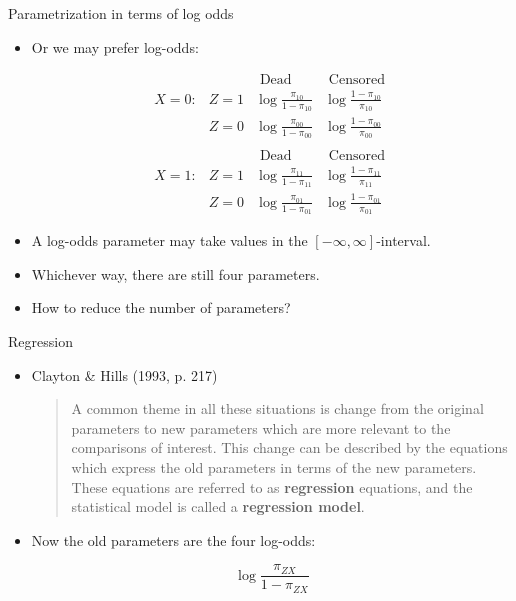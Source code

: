 \documentclass[10pt]{beamer}\usepackage[]{graphicx}\usepackage[]{color}
\begin{document}
\begin{frame}{Parametrization in terms of log odds}
	\begin{itemize}
		\item Or we may prefer log-odds:
		
		$$
		\begin{array}{llcc} 
		&      & \text { Dead } & \text { Censored } \\
		X=0: & Z=1 & \log\frac{\pi_{10}}{1-\pi_{10}} & \log\frac{1-\pi_{10}}{\pi_{10}} \\
		& Z=0 & \log\frac{\pi_{00}}{1- \pi_{00}} & \log\frac{1-\pi_{00}}{\pi_{00}} \\
		& & & \\
		&  & \text { Dead } & \text { Censored } \\
		X=1:&  Z=1 & \log\frac{\pi_{11}}{1-\pi_{11}}      & \log\frac{1-\pi_{11}}{\pi_{11}} \\
		&  Z=0    & \log\frac{\pi_{01}}{1-\pi_{01}} & \log\frac{1-\pi_{01}}{\pi_{01}}
		\end{array}
		$$
		
		\item A log-odds parameter may take values in the $[-\infty, \infty]$-interval.
		\item Whichever way, there are still four parameters.
		\item How to reduce the number of parameters?
	\end{itemize}
\end{frame}


\begin{frame}{Regression}
	\begin{itemize}
		\item Clayton \& Hills (1993, p. 217)
		\begin{quote}
			A common theme in all these situations is change
			from the original parameters to new parameters
			which are more relevant to the comparisons of
			interest. This change can be described by the
			equations which express the old parameters in
			terms of the new parameters. These equations
			are referred to as \textbf{regression} equations, and the
			statistical model is called a \textbf{regression model}.
		\end{quote}
	
	\item Now the old parameters are the four log-odds:
	
	$$
	\log \frac{\pi_{ZX}}{1-\pi_{ZX}}
	$$
	
	\end{itemize}
\end{frame}
\end{document}
